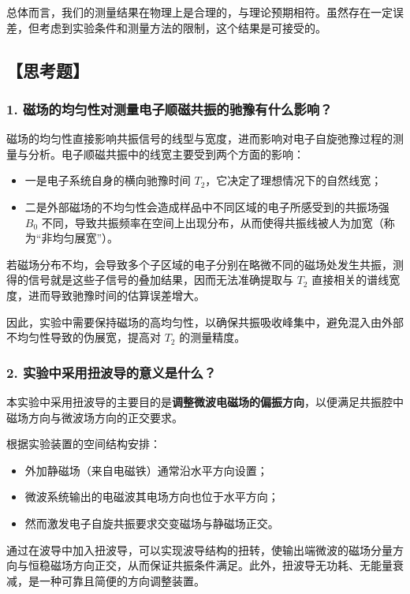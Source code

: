 \documentclass[12pt,a4paper,UTF8]{ctexart}
\begin{document}
总体而言，我们的测量结果在物理上是合理的，与理论预期相符。虽然存在一定误差，但考虑到实验条件和测量方法的限制，这个结果是可接受的。

\subsection*{【思考题】}

\subsubsection*{1. 磁场的均匀性对测量电子顺磁共振的驰豫有什么影响？}

磁场的均匀性直接影响共振信号的线型与宽度，进而影响对电子自旋弛豫过程的测量与分析。电子顺磁共振中的线宽主要受到两个方面的影响：

\begin{itemize}
  \item 一是电子系统自身的横向驰豫时间 \(T_2\)，它决定了理想情况下的自然线宽；
  \item 二是外部磁场的不均匀性会造成样品中不同区域的电子所感受到的共振场强 \(B_0\) 不同，导致共振频率在空间上出现分布，从而使得共振线被人为加宽（称为“非均匀展宽”）。
\end{itemize}

若磁场分布不均，会导致多个子区域的电子分别在略微不同的磁场处发生共振，测得的信号就是这些子信号的叠加结果，因而无法准确提取与 \(T_2\) 直接相关的谱线宽度，进而导致驰豫时间的估算误差增大。

因此，实验中需要保持磁场的高均匀性，以确保共振吸收峰集中，避免混入由外部不均匀性导致的伪展宽，提高对 \(T_2\) 的测量精度。

\subsubsection*{2. 实验中采用扭波导的意义是什么？}

本实验中采用扭波导的主要目的是\textbf{调整微波电磁场的偏振方向}，以便满足共振腔中磁场方向与微波场方向的正交要求。

根据实验装置的空间结构安排：
\begin{itemize}
  \item 外加静磁场（来自电磁铁）通常沿水平方向设置；
  \item 微波系统输出的电磁波其电场方向也位于水平方向；
  \item 然而激发电子自旋共振要求交变磁场与静磁场正交。
\end{itemize}

通过在波导中加入扭波导，可以实现波导结构的扭转，使输出端微波的磁场分量方向与恒稳磁场方向正交，从而保证共振条件满足。此外，扭波导无功耗、无能量衰减，是一种可靠且简便的方向调整装置。
\end{document}
